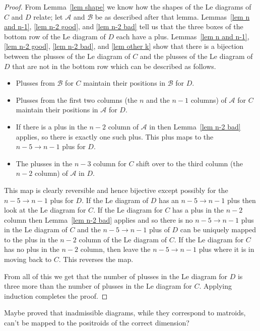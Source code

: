 \documentclass[11pt]{article}
\theoremstyle{remark}
\theoremstyle{definition}
\begin{document}
\begin{proof}
  {}From Lemma~\ref{lem shape} we know how the shapes of the Le diagrams of $C$ and $D$ relate; let $\mathcal{A}$ and $\mathcal{B}$ be as described after that lemma.  Lemmas~\ref{lem n and n-1}, \ref{lem n-2 good}, and \ref{lem n-2 bad} tell us that the three boxes of the bottom row of the Le diagram of $D$ each have a plus.  Lemmas~\ref{lem n and n-1}, \ref{lem n-2 good}, \ref{lem n-2 bad}, and \ref{lem other k} show that there is a bijection between the plusses of the Le diagram of $C$ and the plusses of the Le diagram of $D$ that are not in the bottom row which can be described as follows.
  \begin{itemize}
  \item Plusses from $\mathcal{B}$ for $C$ maintain their positions in $\mathcal{B}$ for $D$.
  \item Plusses from the first two columns (the $n$ and the $n-1$ columns) of $\mathcal{A}$ for $C$ maintain their positions in $\mathcal{A}$ for $D$.
  \item If there is a plus in the $n-2$ column of $\mathcal{A}$ in  then Lemma~\ref{lem n-2 bad} applies, so there is exactly one such plus.  This plus maps to the $n-5\rightarrow n-1$ plus for $D$.
  \item The plusses in the $n-3$ column for $C$ shift over to the third column (the $n-2$ column) of $\mathcal{A}$ in $D$.
  \end{itemize}
  This map is clearly reversible and hence bijective except possibly for the $n-5\rightarrow n-1$ plus for $D$.   If the Le diagram of $D$ has an $n-5\rightarrow n-1$ plus then look at the Le diagram for $C$.  If the Le diagram for $C$ has a plus in the $n-2$ column then Lemma~\ref{lem n-2 bad} applies and so there is no $n-5\rightarrow n-1$ plus in the Le diagram of $C$ and the $n-5\rightarrow n-1$ plus of $D$ can be uniquely mapped to the plus in the $n-2$ column of the Le diagram of $C$.  If the Le diagram for $C$ has no plus in the $n-2$ column, then leave the $n-5\rightarrow n-1$ plus where it is in moving back to $C$.  This reverses the map.

  From all of this we get that the number of plusses in the Le diagram for $D$ is three more than the number of plusses in the Le diagram for $C$.  Applying induction completes the proof.
\end{proof}


{\color{red}Maybe proved that inadmissible diagrams, while they correspond to matroids, can't be mapped to the positroids of the correct dimension? }
\end{document}
